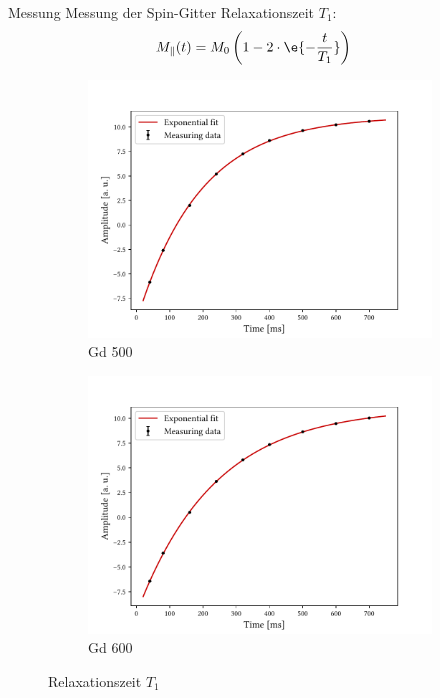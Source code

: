 \begin{frame}{Messung}
Messung der Spin-Gitter Relaxationszeit $T_1$:
	\begin{align*}
	M_\parallel (t)&=M_0\left(1-2\cdot\e{-\frac{t}{T_1}}\right)
	\end{align*}
	\begin{figure}
	\centering
		\begin{subfigure}{.49\textwidth}
		\centering
		\includegraphics[scale=.36]{..//figures//f61_abb_1.pdf}
		\caption{Gd 500}
		\end{subfigure}
		\begin{subfigure}{.49\textwidth}
		\centering
		\includegraphics[scale=.36]{..//figures//f61_abb_1_600.pdf}
		\caption{Gd 600}
		\end{subfigure}
	\caption{Relaxationszeit $T_1$}
	\end{figure}
\end{frame}

